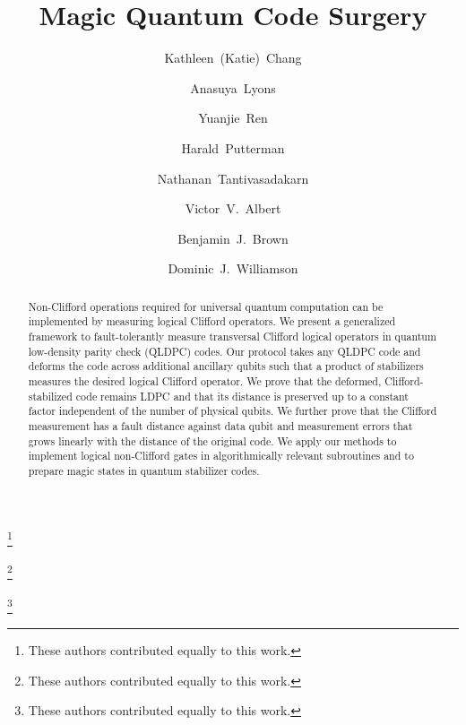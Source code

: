 \documentclass[aps,prx,onecolumn,nofootinbib,11pt,superscriptaddress]{revtex4-2}
\begin{document}
\title{Magic Quantum Code Surgery}

\author{Kathleen~(Katie)~Chang}
\thanks{These authors contributed equally to this work.}

\author{Anasuya~Lyons}
\thanks{These authors contributed equally to this work.}

\author{Yuanjie~Ren}
\thanks{These authors contributed equally to this work.}

\author{Harald~Putterman}

\author{Nathanan~Tantivasadakarn}

\author{Victor~V.~Albert}


\author{Benjamin~J.~Brown}


\author{Dominic~J.~Williamson}

\begin{abstract}
\noindent

Non-Clifford operations required for universal quantum computation can be implemented by measuring logical Clifford operators. We present a generalized framework to fault-tolerantly measure transversal Clifford logical operators in quantum low-density parity check (QLDPC) codes. Our protocol takes any QLDPC code and deforms the code across additional ancillary qubits such that a product of stabilizers measures the desired logical Clifford operator. 
We prove that the deformed, Clifford-stabilized code remains LDPC and that its distance is preserved up to a constant factor independent of the number of physical qubits.
We further prove that the Clifford measurement has a fault distance against data qubit and measurement errors that grows linearly with the distance of the original code. We apply our methods to implement logical non-Clifford gates in algorithmically relevant subroutines and to prepare magic states in quantum stabilizer codes.
\end{abstract}
\end{document}
